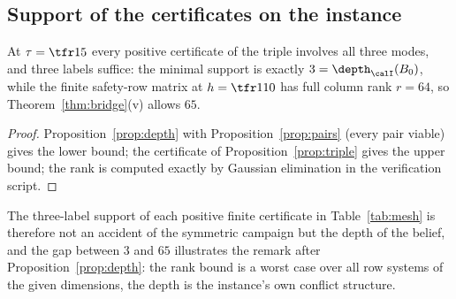 \subsection{Support of the certificates on the instance}

\begin{corollary}\label{cor:support}
At $\tau=\tfr15$ every positive certificate of the triple involves all three modes, and three labels suffice: the minimal support is exactly $3=\depth_\calI(B_0)$, while the finite safety-row matrix at $h=\tfr1{10}$ has full column rank $r=64$, so Theorem~\ref{thm:bridge}(v) allows $65$.
\end{corollary}

\begin{proof}
Proposition~\ref{prop:depth} with Proposition~\ref{prop:pairs} (every pair viable) gives the lower bound; the certificate of Proposition~\ref{prop:triple} gives the upper bound; the rank is computed exactly by Gaussian elimination in the verification script.
\end{proof}

The three-label support of each positive finite certificate in Table~\ref{tab:mesh} is therefore not an accident of the symmetric campaign but the depth of the belief, and the gap between $3$ and $65$ illustrates the remark after Proposition~\ref{prop:depth}: the rank bound is a worst case over all row systems of the given dimensions, the depth is the instance's own conflict structure.
